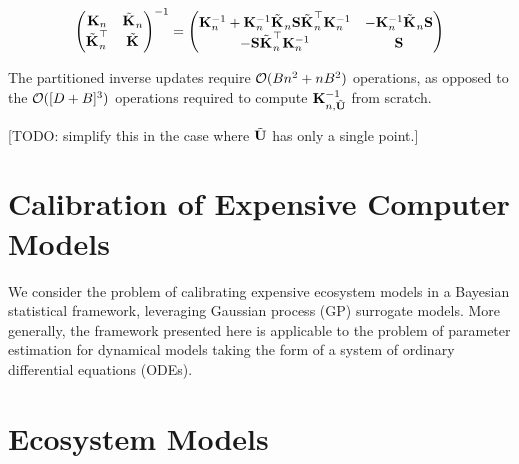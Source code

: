\documentclass[12pt]{article}
\begin{document}
\begin{align}
\begin{pmatrix} \KerMat & \tilde{\KerMat[]}_{\designIdx}  \\ \tilde{\KerMat[]}_{\designIdx}^\top & \tilde{\KerMat[]} \end{pmatrix}^{-1} 
= \begin{pmatrix} \KerMat^{-1} + \KerMat^{-1}\tilde{\KerMat[]}_{\designIdx}\mathbf{S} \tilde{\KerMat[]}_{\designIdx}^\top \KerMat^{-1} & -\KerMat^{-1}\tilde{\KerMat[]}_{\designIdx} \mathbf{S}  \\
-\mathbf{S} \tilde{\KerMat[]}_{\designIdx}^\top \KerMat^{-1} & \mathbf{S}  \end{pmatrix} \label{block_inverse}
\end{align}

The partitioned inverse updates require $\BigO(\Nbatch \designIdx^2 + \designIdx \Nbatch^2)$ operations, as opposed to the 
$\BigO([\Npar + \Nbatch]^3)$ operations required to compute $\KerMat[\designIdx, \batchMat]^{-1}$ from scratch. 
 
 [TODO: simplify this in the case where $\batchMat$ has only a single point.]













\section{Calibration of Expensive Computer Models}
We consider the problem of calibrating expensive ecosystem models in a Bayesian statistical framework, leveraging 
Gaussian process (GP) surrogate models. More generally, the framework presented here is applicable to the problem of parameter 
estimation for dynamical models taking the form of a system of ordinary differential equations (ODEs). 

\section{Ecosystem Models}
\end{document}
